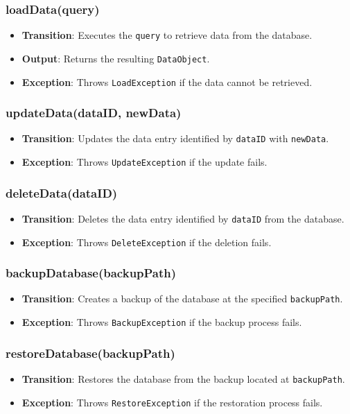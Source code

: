 \documentclass[12pt, titlepage]{article}
\begin{document}
\subsubsection{loadData(query)}
\begin{itemize}
    \item \textbf{Transition}: Executes the \texttt{query} to retrieve data from the database.
    \item \textbf{Output}: Returns the resulting \texttt{DataObject}.
    \item \textbf{Exception}: Throws \texttt{LoadException} if the data cannot be retrieved.
\end{itemize}

\subsubsection{updateData(dataID, newData)}
\begin{itemize}
    \item \textbf{Transition}: Updates the data entry identified by \texttt{dataID} with \texttt{newData}.
    \item \textbf{Exception}: Throws \texttt{UpdateException} if the update fails.
\end{itemize}

\subsubsection{deleteData(dataID)}
\begin{itemize}
    \item \textbf{Transition}: Deletes the data entry identified by \texttt{dataID} from the database.
    \item \textbf{Exception}: Throws \texttt{DeleteException} if the deletion fails.
\end{itemize}

\subsubsection{backupDatabase(backupPath)}
\begin{itemize}
    \item \textbf{Transition}: Creates a backup of the database at the specified \texttt{backupPath}.
    \item \textbf{Exception}: Throws \texttt{BackupException} if the backup process fails.
\end{itemize}

\subsubsection{restoreDatabase(backupPath)}
\begin{itemize}
    \item \textbf{Transition}: Restores the database from the backup located at \texttt{backupPath}.
    \item \textbf{Exception}: Throws \texttt{RestoreException} if the restoration process fails.
\end{itemize}
\end{document}
